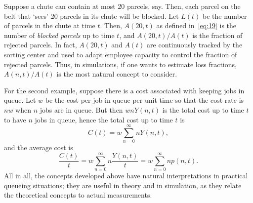 Suppose a chute can contain at most 20 parcels, say.
Then, each parcel on the belt that `sees' 20 parcels in its chute will be blocked.
Let $L(t)$ be the number of parcels in the chute at time $t$.
Then, $A(20,t)$ as defined in~\cref{eq:19} is the number of\emph{ blocked parcels} up to time $t$, and $A(20,t)/A(t)$ is the fraction of rejected parcels.
In fact, $A(20,t)$ and $A(t)$ are continuously tracked by the sorting center and used to adapt employee capacity to control the fraction of rejected parcels.
Thus, in simulations, if one wants to estimate loss fractions, $A(n,t)/A(t)$ is the most natural concept to consider.

For the second example, suppose there is a cost associated with keeping jobs in queue.
Let $w$ be the cost per job in queue per unit time so that the cost rate is $n w$ when $n$ jobs are in queue.
But then $ w n Y(n,t)$ is the total cost up to time $t$ to have $n$ jobs in queue, hence the total cost up to time $t$ is
  \begin{equation*}
C(t) =     w \sum_{n=0}^\infty n Y(n,t),
  \end{equation*}
and the average cost is
\begin{equation*}
\frac{C(t)}t =    w \sum_{n=0}^\infty n \frac{Y(n,t)}t = w \sum_{n=0}^\infty n p(n,t).
\end{equation*}
All in all, the concepts developed above have natural interpretations
in practical queueing situations; they are useful in theory and in
simulation, as they relate the theoretical concepts to actual measurements.







